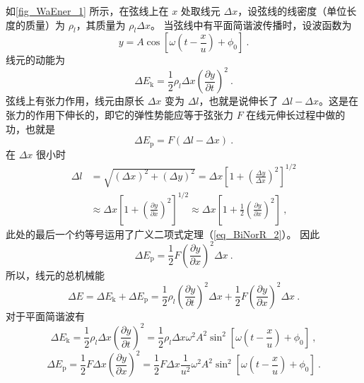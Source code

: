 如\autoref{fig_WaEner_1} 所示，在弦线上在 $x$ 处取线元 $\Delta x$，设弦线的线密度（单位长度的质量）为 $\rho_l$，其质量为 $\rho_l\Delta x$。
当弦线中有平面简谐波传播时，设波函数为
\begin{equation}
y=A \cos \left[\omega\left(t-\frac{x}{u}\right)+\phi_{0}\right]~.
\end{equation}
线元的动能为
\begin{equation}
\Delta E_{\mathrm{k}}=\frac{1}{2} \rho_{l} \Delta x\left(\frac{\partial y}{\partial t}\right)^{2}~.
\end{equation}
弦线上有张力作用，线元由原长 $\Delta x$ 变为 $\Delta l$，也就是说伸长了 $\Delta l-\Delta x$。这是在张力的作用下伸长的，即它的弹性势能应等于弦张力 $F$ 在线元伸长过程中做的功，也就是
\begin{equation}
\Delta E_{\mathrm{p}}=F(\Delta l-\Delta x)~.
\end{equation}
在 $\Delta x$ 很小时
\begin{equation}
\begin{aligned} \Delta l &=\sqrt{(\Delta x)^{2}+(\Delta y)^{2}}=\Delta x\left[1+\left(\frac{\Delta y}{\Delta x}\right)^{2}\right]^{1 / 2} \\ & \approx \Delta x\left[1+\left(\frac{\partial y}{\partial x}\right)^{2}\right]^{1 / 2} \approx \Delta x\left[1+\frac{1}{2}\left(\frac{\partial y}{\partial x}\right)^{2}\right] ~,\end{aligned}
\end{equation}
此处的最后一个约等号运用了广义二项式定理（\autoref{eq_BiNorR_2}）。
因此
\begin{equation}
\Delta E_{\mathrm{p}}=\frac{1}{2} F\left(\frac{\partial y}{\partial x}\right)^{2} \Delta x~.
\end{equation}
所以，线元的总机械能
\begin{equation}
\Delta E=\Delta E_{\mathrm{k}}+\Delta E_{\mathrm{p}}=\frac{1}{2} \rho_{l}\left(\frac{\partial y}{\partial t}\right)^{2} \Delta x+\frac{1}{2} F\left(\frac{\partial y}{\partial x}\right)^{2} \Delta x~.
\end{equation}
对于平面简谐波有
\begin{equation}
\Delta E_{\mathrm{k}}=\frac{1}{2} \rho_{l} \Delta x\left(\frac{\partial y}{\partial t}\right)^{2}=\frac{1}{2} \rho_{l} \Delta x \omega^{2} A^{2} \sin ^{2}\left[\omega\left(t-\frac{x}{u}\right)+\phi_{0}\right]~,
\end{equation}
\begin{equation}
\Delta E_{\mathrm{p}}=\frac{1}{2} F \Delta x\left(\frac{\partial y}{\partial x}\right)^{2}=\frac{1}{2} F \Delta x \frac{1}{u^{2}} \omega^{2} A^{2} \sin ^{2}\left[\omega\left(t-\frac{x}{u}\right)+\phi_{0}\right]~.
\end{equation}

